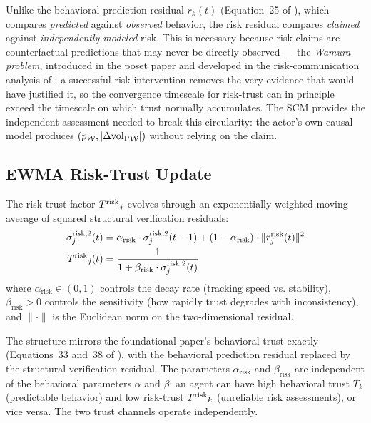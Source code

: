 Unlike the behavioral prediction residual $r_k(t)$ (Equation~25 of
\citet{lasser2026gfm}), which compares \emph{predicted} against
\emph{observed} behavior, the risk residual compares \emph{claimed} against
\emph{independently modeled} risk. This is necessary because risk claims
are counterfactual predictions that may never be directly observed —
the \emph{Wamura problem}, introduced in the poset paper
\citep{lasser2026poset} and developed in the risk-communication analysis
of \citet[\S4]{lasser2026horizon}: a successful risk
intervention removes the very evidence that would have justified it,
so the convergence timescale for risk-trust can in principle exceed
the timescale on which trust normally accumulates. The SCM provides
the independent assessment needed to break this circularity: the
actor's own causal model produces $(p_{\mathcal{W}},
|\Delta {\operatorname{vol}_{\mathrm{P}}}_{\mathcal{W}}|)$ without relying on the claim.

\subsection{EWMA Risk-Trust Update}

\begin{definition}
\label{def:risk_trust_dynamics}
The risk-trust factor ${T^{\mathrm{risk}}}_j$ evolves through an exponentially weighted
    moving average of squared structural verification residuals:
\begin{align}
\label{eq:risk_sigma}
\sigma_j^{\mathrm{risk},2}(t) &= \alpha_{\mathrm{risk}} \cdot
    \sigma_j^{\mathrm{risk},2}(t-1) + (1 - \alpha_{\mathrm{risk}}) \cdot
    \|r_j^{\mathrm{risk}}(t)\|^2 \\
\label{eq:risk_trust_update}
{T^{\mathrm{risk}}}_j(t) &= \frac{1}{1 + \beta_{\mathrm{risk}} \cdot
    \sigma_j^{\mathrm{risk},2}(t)}
\end{align}
where $\alpha_{\mathrm{risk}} \in (0, 1)$ controls the decay rate
    (tracking speed vs. stability), $\beta_{\mathrm{risk}} > 0$ controls the
    sensitivity (how rapidly trust degrades with inconsistency), and
    $\|\cdot\|$ is the Euclidean norm on the two-dimensional residual.
\end{definition}

The structure mirrors the foundational paper's behavioral trust exactly
(Equations~33 and~38 of \citet{lasser2026gfm}), with the behavioral
prediction residual replaced by the structural verification residual. The
parameters $\alpha_{\mathrm{risk}}$ and $\beta_{\mathrm{risk}}$ are
independent of the behavioral parameters $\alpha$ and $\beta$: an agent can
have high behavioral trust $T_k$ (predictable behavior) and low risk-trust
${T^{\mathrm{risk}}}_k$ (unreliable risk assessments), or vice versa. The two trust
channels operate independently.

